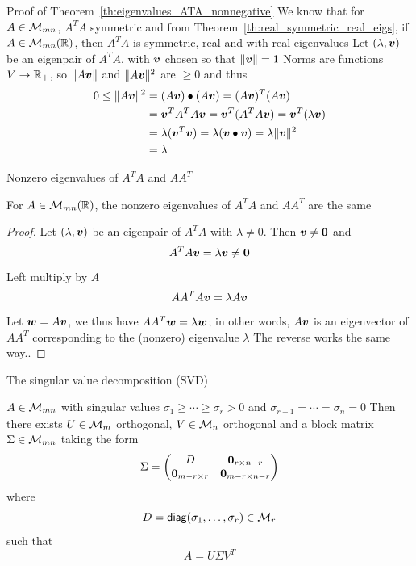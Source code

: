 \documentclass[aspectratio=169]{beamer}\usepackage[]{graphicx}\usepackage[]{xcolor}
\begin{document}
\begin{frame}[red]{Proof of Theorem~\ref{th:eigenvalues_ATA_nonnegative}}
We know that for $A\in\mathcal{M}_{mn}$, $A^TA$ symmetric and from Theorem~\ref{th:real_symmetric_real_eigs}, if $A\in\mathcal{M}_{mn}(\mathbb{R})$, then $A^TA$ is symmetric, real and with real eigenvalues
\vfill
Let $(\lambda,\bm{v})$ be an eigenpair of $A^TA$, with $\bm{v}$ chosen so that $\|\bm{v}\|=1$
\vfill 
Norms are functions $V\to\mathbb{R}_+$, so $\|A\bm{v}\|$ and $\|A\bm{v}\|^2$ are $\geq 0$ and thus
\begin{align*}
0\leq \|A\bv\|^2 &= (A\bv)\bullet(A\bv) = (A\bv)^T(A\bv) \\
&= \bv^TA^TA\bv = \bv^T(A^TA\bv) = \bv^T(\lambda\bv) \\
&= \lambda(\bv^T\bv) = \lambda(\bv\bullet\bv) = \lambda\|\bv\|^2 \\
&= \lambda\hfill\qedhere
\end{align*}
\end{frame}

\begin{frame}{Nonzero eigenvalues of $A^TA$ and $AA^T$}
\begin{theorem}
For $A\in\mathcal{M}_{mn}(\mathbb{R})$, the nonzero eigenvalues of $A^TA$ and $AA^T$ are the same
\end{theorem}
\vfill
\begin{proof}
Let $(\lambda,\bm{v})$ be an eigenpair of $A^TA$ with $\lambda\neq 0$. Then $\bv\neq\b0$ and
\[
	A^TA\bv=\lambda\bv\neq\b0
\]
Left multiply by $A$
\[
	AA^TA\bm{v} = \lambda A\bm{v}
\]
Let $\bm{w}=A\bm{v}$, we thus have $AA^T\bm{w}=\lambda\bm{w}$; in other words, $A\bm{v}$ is an eigenvector of $AA^T$ corresponding to the (nonzero) eigenvalue $\lambda$
\vfill
The reverse works the same way..
\end{proof}
\end{frame}


\begin{frame}{The singular value decomposition (SVD)}
\begin{importanttheorem}[SVD]\label{th:SVD}
$A\in\mathcal{M}_{mn}$ with singular values $\sigma_1\geq\cdots\geq\sigma_r>0$ and $\sigma_{r+1}=\cdots=\sigma_n=0$
\vskip0.5cm
Then there exists $U\in\mathcal{M}_m$ orthogonal, $V\in\mathcal{M}_n$ orthogonal and a block matrix $\Sigma\in\mathcal{M}_{mn}$ taking the form
\[
\Sigma=
\begin{pmatrix}
D & \b0_{r\times n-r} \\
\b0_{m-r\times r} & \b0_{m-r\times n-r}
\end{pmatrix}
\]
where 
\[
D = \mathsf{diag}(\sigma_1,\ldots,\sigma_r)\in\mathcal{M}_r
\] 
such that
\[
A=U\Sigma V^T
\]
\end{importanttheorem}
\end{frame}
\end{document}
